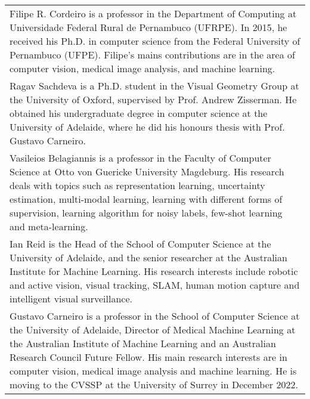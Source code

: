 \documentclass[review]{elsarticle}
\begin{document}
\begin{minipage}{0.60\textwidth}\fontsize{8pt}{12pt}\selectfont
\begin{tabular}{p{\textwidth}}
\thispagestyle{empty}
Filipe R. Cordeiro is a professor in the Department of Computing at Universidade Federal Rural de Pernambuco (UFRPE). In 2015, he received his Ph.D. in computer science from the Federal University of Pernambuco (UFPE). Filipe’s mains contributions are in the area of computer vision, medical image analysis, and machine learning.
\\[1\baselineskip]
Ragav Sachdeva is a Ph.D. student in the Visual Geometry Group at the University of Oxford, supervised by Prof. Andrew Zisserman. He obtained his undergraduate degree in computer science at the University of Adelaide, where he did his honours thesis with Prof. Gustavo Carneiro.
\\[1\baselineskip]
Vasileios Belagiannis is a professor in the Faculty of Computer Science at Otto von Guericke University Magdeburg. His research deals with topics such as representation learning, uncertainty estimation, multi-modal learning, learning with different forms of supervision, learning algorithm for noisy labels, few-shot learning and meta-learning.
\\[1\baselineskip]
Ian Reid is the Head of the School of Computer Science at the University of Adelaide, and the senior researcher at the Australian Institute for Machine Learning. His research interests include robotic and active vision, visual tracking, SLAM, human motion capture and intelligent visual surveillance.
\\[1\baselineskip]
Gustavo Carneiro is a professor in the School of Computer Science at the University of Adelaide, Director of Medical Machine Learning at the Australian Institute of Machine Learning and an Australian Research Council Future Fellow. His main research interests are in computer vision, medical image analysis and machine learning. He is moving to the CVSSP at the University of Surrey in December 2022.

\end{tabular}
\end{minipage}
\end{document}
